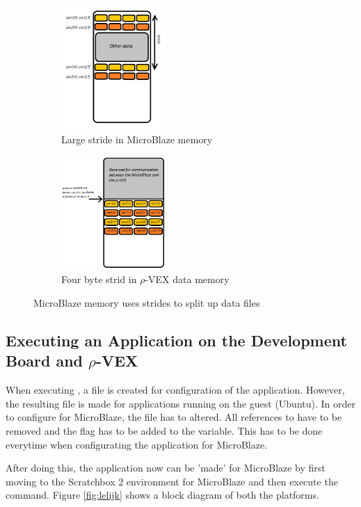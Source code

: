 \begin{figure}[htb]
	\centering
	\begin{subfigure}{0.3\textwidth}
		\centering
		\includegraphics[width=150px]{Pictures/stride}
		\caption{Large stride in MicroBlaze memory}
		\label{fig:stride}
	\end{subfigure}
	\quad
	\begin{subfigure}{0.3\textwidth}
		\centering
		\includegraphics[width=150px]{Pictures/pixels_dmem}
		\caption{Four byte strid in $\rho$-VEX data memory}
		\label{fig:testpixels}
	\end{subfigure}
\caption{MicroBlaze memory uses strides to split up data files}%
\label{}%
\end{figure}

\subsection{Executing an Application on the Development Board and $\rho$-VEX}
\label{sec:executing}
When executing , a file is created for configuration of the application. However, the resulting  file is made for applications running on the guest (Ubuntu). In order to configure for MicroBlaze, the  file has to altered. All references to  have to be removed and the  flag has to be added to the  variable. This has to be done everytime when configurating the application for MicroBlaze.

After doing this, the application now can be 'made' for MicroBlaze by first moving to the Scratchbox 2 environment for MicroBlaze and then execute the  command. Figure \ref{fig:lelijk} shows a block diagram of both the platforms.

